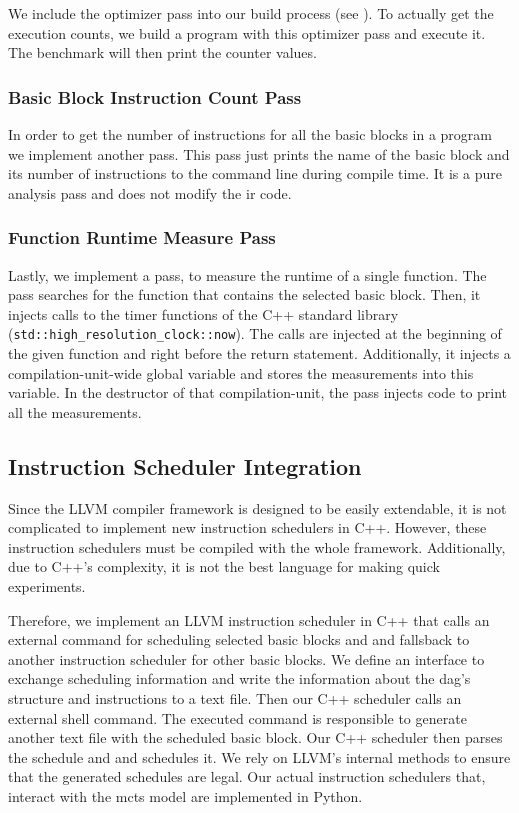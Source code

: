We include the optimizer pass into our build process (see ).
To actually get the execution counts, we build a program with this optimizer pass and execute it.
The benchmark will then print the counter values.

\subsubsection{Basic Block Instruction Count Pass}
\label{sec:approach:instr-count}
In order to get the number of instructions for all the basic blocks in a program we implement another pass.
This pass just prints the name of the basic block and its number of instructions to the command line during compile time.
It is a pure analysis pass and does not modify the \ac{ir} code.

\subsubsection{Function Runtime Measure Pass}
Lastly, we implement a pass, to measure the runtime of a single function.
The pass searches for the function that contains the selected basic block.
Then, it injects calls to the timer functions of the C++ standard library (\lstinline|std::high_resolution_clock::now|).
The calls are injected at the beginning of the given function and right before the return statement.
Additionally, it injects a compilation-unit-wide global variable and stores the measurements into this variable.
In the destructor of that compilation-unit, the pass injects code to print all the measurements.

\subsection{Instruction Scheduler Integration}
Since the LLVM compiler framework is designed to be easily extendable, it is not complicated to implement new instruction schedulers in C++.
However, these instruction schedulers must be compiled with the whole framework.
Additionally, due to C++'s complexity, it is not the best language for making quick experiments.

Therefore, we implement an LLVM instruction scheduler in C++ that calls an external command for scheduling selected basic blocks and and fallsback to another instruction scheduler for other basic blocks.
We define an interface to exchange scheduling information and write the information about the \ac{dag}'s structure and instructions to a text file.
Then our C++ scheduler calls an external shell command.
The executed command is responsible to generate another text file with the scheduled basic block.
Our C++ scheduler then parses the schedule and and schedules it.
We rely on LLVM's internal methods to ensure that the generated schedules are legal.
Our actual instruction schedulers that, \eg interact with the \ac{mcts} model are implemented in Python.


